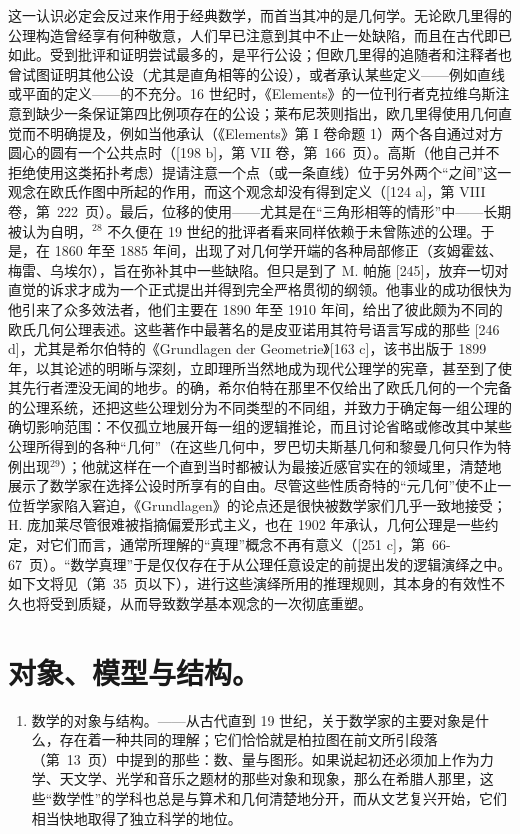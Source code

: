 这一认识必定会反过来作用于经典数学，而首当其冲的是几何学。无论欧几里得的公理构造曾经享有何种敬意，人们早已注意到其中不止一处缺陷，而且在古代即已如此。受到批评和证明尝试最多的，是平行公设；但欧几里得的追随者和注释者也曾试图证明其他公设（尤其是直角相等的公设），或者承认某些定义——例如直线或平面的定义——的不充分。16 世纪时，《Elements》的一位刊行者克拉维乌斯注意到缺少一条保证第四比例项存在的公设；莱布尼茨则指出，欧几里得使用几何直觉而不明确提及，例如当他承认（《Elements》第 I 卷命题 1）两个各自通过对方圆心的圆有一个公共点时（{[}198 b{]}，第 VII 卷，第~166~页）。高斯（他自己并不拒绝使用这类拓扑考虑）提请注意一个点（或一条直线）位于另外两个“之间”这一观念在欧氏作图中所起的作用，而这个观念却没有得到定义（{[}124 a{]}，第 VIII 卷，第~222~页）。最后，位移的使用——尤其是在“三角形相等的情形”中——长期被认为自明，\(^{28}\) 不久便在 19 世纪的批评者看来同样依赖于未曾陈述的公理。于是，在 1860 年至 1885 年间，出现了对几何学开端的各种局部修正（亥姆霍兹、梅雷、乌埃尔），旨在弥补其中一些缺陷。但只是到了 M. 帕施 {[}245{]}，放弃一切对直觉的诉求才成为一个正式提出并得到完全严格贯彻的纲领。他事业的成功很快为他引来了众多效法者，他们主要在 1890 年至 1910 年间，给出了彼此颇为不同的欧氏几何公理表述。这些著作中最著名的是皮亚诺用其符号语言写成的那些 {[}246 d{]}，尤其是希尔伯特的《Grundlagen der Geometrie》{[}163 c{]}，该书出版于 1899 年，以其论述的明晰与深刻，立即理所当然地成为现代公理学的宪章，甚至到了使其先行者湮没无闻的地步。的确，希尔伯特在那里不仅给出了欧氏几何的一个完备的公理系统，还把这些公理划分为不同类型的不同组，并致力于确定每一组公理的确切影响范围：不仅孤立地展开每一组的逻辑推论，而且讨论省略或修改其中某些公理所得到的各种“几何”（在这些几何中，罗巴切夫斯基几何和黎曼几何只作为特例出现\(^{29}\)）；他就这样在一个直到当时都被认为最接近感官实在的领域里，清楚地展示了数学家在选择公设时所享有的自由。尽管这些性质奇特的“元几何”使不止一位哲学家陷入窘迫，《Grundlagen》的论点还是很快被数学家们几乎一致地接受；H. 庞加莱尽管很难被指摘偏爱形式主义，也在 1902 年承认，几何公理是一些约定，对它们而言，通常所理解的“真理”概念不再有意义（{[}251 c{]}，第~66-67~页）。“数学真理”于是仅仅存在于从公理任意设定的前提出发的逻辑演绎之中。如下文将见（第~35~页以下），进行这些演绎所用的推理规则，其本身的有效性不久也将受到质疑，从而导致数学基本观念的一次彻底重塑。

\section*{对象、模型与结构。}
{}

\begin{enumerate}
\def\labelenumi{\Alph{enumi})}
\tightlist
\item
  数学的对象与结构。——从古代直到 19 世纪，关于数学家的主要对象是什么，存在着一种共同的理解；它们恰恰就是柏拉图在前文所引段落（第~13~页）中提到的那些：数、量与图形。如果说起初还必须加上作为力学、天文学、光学和音乐之题材的那些对象和现象，那么在希腊人那里，这些“数学性”的学科也总是与算术和几何清楚地分开，而从文艺复兴开始，它们相当快地取得了独立科学的地位。
\end{enumerate}

